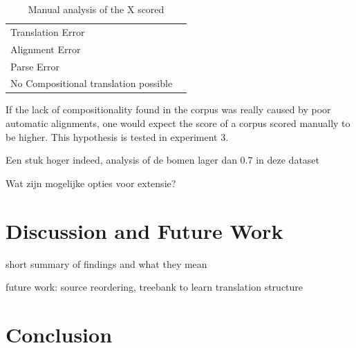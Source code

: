 \documentclass{report}
\theoremstyle{indented}
\begin{document}
\begin{table}[!h]\label{tab:class}
\begin{tabular}{|l|l|}
\hline
Translation Error & \\
Alignment Error & \\
Parse Error &\\
No Compositional translation possible & \\
\hline
\end{tabular}
\caption{Manual analysis of the X scored}
\end{table}

If the lack of compositionality found in the corpus was really caused by poor automatic alignments, one would expect the score of a corpus scored manually to be higher. This hypothesis is tested in experiment 3.

Een stuk hoger indeed, analysis of de bomen lager dan 0.7 in deze dataset

Wat zijn mogelijke opties voor extensie?

\chapter{Discussion and Future Work}

short summary of findings and what they mean

future work: source reordering, treebank to learn translation structure


\chapter{Conclusion}











\end{document}
